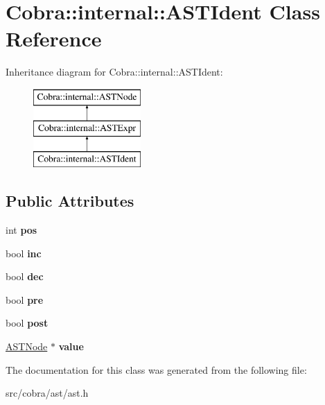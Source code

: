 \hypertarget{class_cobra_1_1internal_1_1_a_s_t_ident}{\section{Cobra\+:\+:internal\+:\+:A\+S\+T\+Ident Class Reference}
\label{class_cobra_1_1internal_1_1_a_s_t_ident}
}
Inheritance diagram for Cobra\+:\+:internal\+:\+:A\+S\+T\+Ident\+:\begin{figure}[H]
\begin{center}
\leavevmode
\includegraphics[height=3.000000cm]{class_cobra_1_1internal_1_1_a_s_t_ident}
\end{center}
\end{figure}
\subsection*{Public Attributes}
\begin{DoxyCompactItemize}
\item 
\hypertarget{class_cobra_1_1internal_1_1_a_s_t_ident_ab097c56a4c95a65cb9d1396fcbfcbca8}{int {\bfseries pos}}\label{class_cobra_1_1internal_1_1_a_s_t_ident_ab097c56a4c95a65cb9d1396fcbfcbca8}

\item 
\hypertarget{class_cobra_1_1internal_1_1_a_s_t_ident_a2cab07f99a65917af3a354f99fbbd763}{bool {\bfseries inc}}\label{class_cobra_1_1internal_1_1_a_s_t_ident_a2cab07f99a65917af3a354f99fbbd763}

\item 
\hypertarget{class_cobra_1_1internal_1_1_a_s_t_ident_a51b08c5ac2daa8c97ad2ccf978b946a4}{bool {\bfseries dec}}\label{class_cobra_1_1internal_1_1_a_s_t_ident_a51b08c5ac2daa8c97ad2ccf978b946a4}

\item 
\hypertarget{class_cobra_1_1internal_1_1_a_s_t_ident_aa159b779de1eeb047d3ba7a0977d4e5f}{bool {\bfseries pre}}\label{class_cobra_1_1internal_1_1_a_s_t_ident_aa159b779de1eeb047d3ba7a0977d4e5f}

\item 
\hypertarget{class_cobra_1_1internal_1_1_a_s_t_ident_a0183fff508335a94f78c6ea6050b1574}{bool {\bfseries post}}\label{class_cobra_1_1internal_1_1_a_s_t_ident_a0183fff508335a94f78c6ea6050b1574}

\item 
\hypertarget{class_cobra_1_1internal_1_1_a_s_t_ident_a95f693066082ffed605899d41f37c3a5}{\hyperlink{class_cobra_1_1internal_1_1_a_s_t_node}{A\+S\+T\+Node} $\ast$ {\bfseries value}}\label{class_cobra_1_1internal_1_1_a_s_t_ident_a95f693066082ffed605899d41f37c3a5}

\end{DoxyCompactItemize}


The documentation for this class was generated from the following file\+:\begin{DoxyCompactItemize}
\item 
src/cobra/ast/ast.\+h\end{DoxyCompactItemize}
